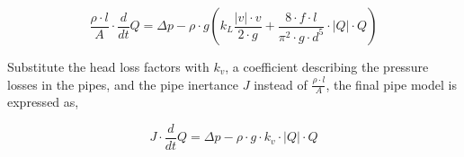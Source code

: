 
\begin{equation}\label{eq:final_pipe}
\frac{\rho \cdot l}{A} \cdot \frac{d}{dt}Q = \Delta p - \rho\cdot g\left(k_L \frac{ |v|\cdot v }{2\cdot g}+ \frac{8\cdot f  \cdot l}{\pi^2\cdot g \cdot d^5} \cdot |Q| \cdot Q\right) 
\end{equation}

Substitute the head loss factors with $k_v$, a coefficient describing the pressure losses in the pipes, and the pipe inertance $J$ instead of $\frac {\rho\cdot l}{A}$, the final pipe model is expressed as,

\begin{equation}\label{eq:pipe_model}
  J\cdot \frac{d}{dt}Q = \Delta p - \rho \cdot g \cdot k_v \cdot |Q| \cdot Q
\end{equation}
